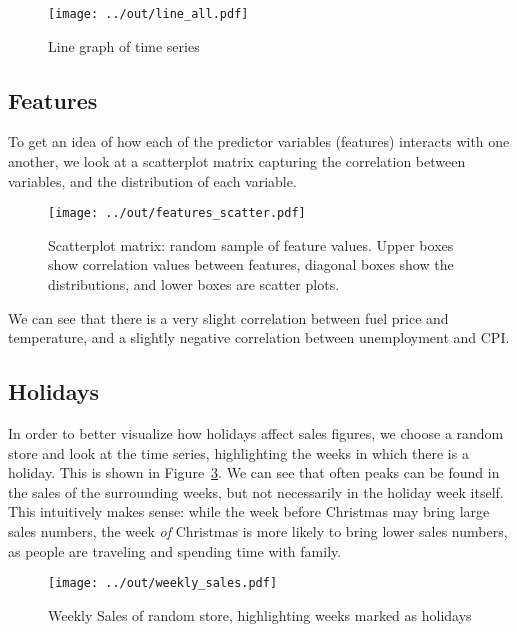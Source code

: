 \documentclass{article}
\begin{document}
\begin{figure}[H]
    \centering
    \captionsetup{width=.6\textwidth}
    \texttt{[image: ../out/line\_all.pdf]}
    \caption{Line graph of time series}
    \label{line_all}
\end{figure}

\subsection{Features}
To get an idea of how each of the predictor variables (features) interacts with one another, we look at a scatterplot matrix capturing the correlation between variables, and the distribution of each variable.

\begin{figure}[H]
    \centering
    \captionsetup{width=.6\textwidth}
    \texttt{[image: ../out/features\_scatter.pdf]}
    \caption{Scatterplot matrix: random sample of feature values. Upper boxes show correlation values between features, diagonal boxes show the distributions, and lower boxes are scatter plots.}
    \label{weekly_sales}
\end{figure}

We can see that there is a very slight correlation between fuel price and temperature, and a slightly negative correlation between unemployment and CPI.


\subsection{Holidays}

In order to better visualize how holidays affect sales figures, we choose a random store and look at the time series, highlighting the weeks in which there is a holiday. This is shown in Figure~\ref{weekly_sales}. We can see that often peaks can be found in the sales of the surrounding weeks, but not necessarily in the holiday week itself. This intuitively makes sense: while the week before Christmas may bring large sales numbers, the week \emph{of} Christmas is more likely to bring lower sales numbers, as people are traveling and spending time with family.

\begin{figure}[H]
    \centering
    \captionsetup{width=.6\textwidth}
    \texttt{[image: ../out/weekly\_sales.pdf]}
    \caption{Weekly Sales of random store, highlighting weeks marked as holidays}
    \label{weekly_sales}
\end{figure}
\end{document}
